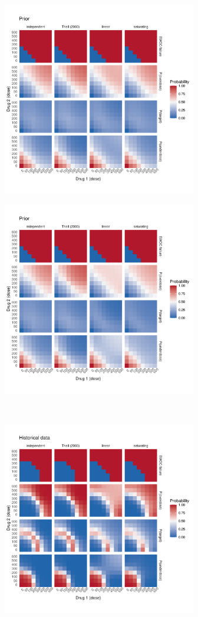 \documentclass[AMA,STIX1COL]{WileyNJD-v2}
\begin{document}
\begin{figure}[p]
\centering
{
\begin{subfigure}[t]{.45\linewidth}
\caption{}
{\includegraphics[width=240pt]{figures/ggplot_mu_sd_inter_0_5_Prior.pdf}}
\end{subfigure}
\hspace{1mm}
\begin{subfigure}[t]{.45\linewidth}
\caption{}
{\includegraphics[width=240pt]{figures/ggplot_mu_sd_inter_1_5_Prior.pdf}}
\end{subfigure}
\\
\begin{subfigure}[t]{.45\linewidth}
\caption{}
{\includegraphics[width=240pt]{figures/ggplot_mu_sd_inter_0_5_Historical_data.pdf}}

\end{subfigure}}
\end{figure}
\end{document}
